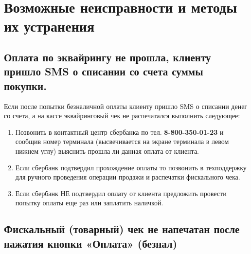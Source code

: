 \newpage
\section{Возможные неисправности и методы их устранения}
\subsection{Оплата по эквайрингу не прошла, клиенту пришло SMS  о списании со счета суммы покупки.}
Если после попытки безналичной оплаты клиенту пришло SMS о списании денег со счета, а на кассе эквайринговый чек не распечатался выполнить следующее:

\begin{enumerate}	
	\item Позвонить в контактный центр сбербанка по тел. \textbf{8-800-350-01-23} и сообщив номер терминала
	(высвечивается на экране терминала в левом нижнем углу) выяснить прошла ли данная оплата от клиента.

	\item Если сбербанк подтвердил прохождение оплаты то позвонить в техподдержку для ручного проведения операции продажи и распечатки фискального чека.
	
	\item Если сбербанк НЕ подтвердил оплату от клиента предложить провести попытку оплаты еще раз или заплатить наличкой.
		
\end{enumerate}	

\subsection{Фискальный (товарный) чек не напечатан после нажатия кнопки «Оплата» (безнал)}

